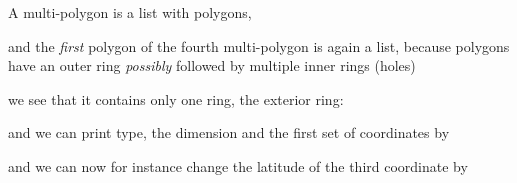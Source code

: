 \documentclass[]{book}
\newenvironment{Shaded}{\begin{snugshade}}{\end{snugshade}}
\newcommand{\CommentTok}[1]{\textcolor[rgb]{0.56,0.35,0.01}{\textit{#1}}}
\newcommand{\DecValTok}[1]{\textcolor[rgb]{0.00,0.00,0.81}{#1}}
\newcommand{\FloatTok}[1]{\textcolor[rgb]{0.00,0.00,0.81}{#1}}
\newcommand{\KeywordTok}[1]{\textcolor[rgb]{0.13,0.29,0.53}{\textbf{#1}}}
\newcommand{\NormalTok}[1]{#1}
\newcommand{\OperatorTok}[1]{\textcolor[rgb]{0.81,0.36,0.00}{\textbf{#1}}}
\newcommand{\StringTok}[1]{\textcolor[rgb]{0.31,0.60,0.02}{#1}}
\begin{document}
A multi-polygon is a list with polygons,

\begin{Shaded}
\end{Shaded}

and the \emph{first} polygon of the fourth multi-polygon is again a list,
because polygons have an outer ring \emph{possibly} followed by multiple inner
rings (holes)

\begin{Shaded}
\end{Shaded}

we see that it contains only one ring, the exterior ring:

\begin{Shaded}
\end{Shaded}

and we can print type, the dimension and the first set of coordinates by

\begin{Shaded}
\end{Shaded}

and we can now for instance change the latitude of the third coordinate by

\begin{Shaded}
\end{Shaded}


\end{document}
